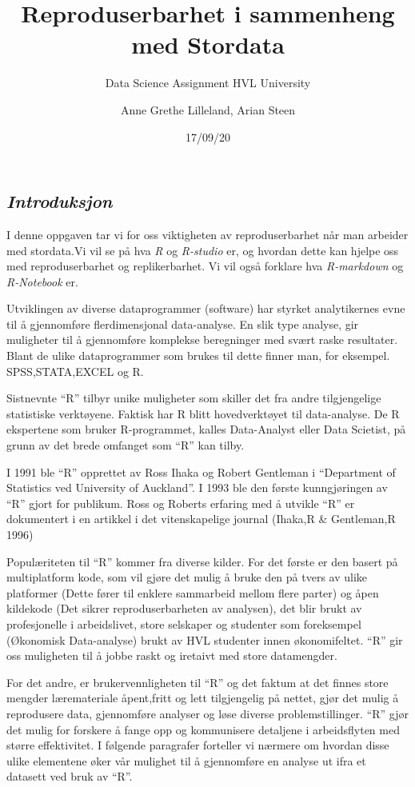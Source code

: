 \documentclass[
  norsk,
]{article}
\title{Reproduserbarhet i sammenheng med Stordata}
\subtitle{Data Science Assignment HVL University}
\author{Anne Grethe Lilleland, Arian Steen}
\date{17/09/20}
\begin{document}
\maketitle

\hypertarget{introduksjon}{%
\subsection{\texorpdfstring{
\emph{Introduksjon}}{ Introduksjon}}\label{introduksjon}}

I denne oppgaven tar vi for oss viktigheten av reproduserbarhet når man
arbeider med stordata.Vi vil se på hva \emph{R} og \emph{R-studio} er,
og hvordan dette kan hjelpe oss med reproduserbarhet og replikerbarhet.
Vi vil også forklare hva \emph{R-markdown} og \emph{R-Notebook} er.

Utviklingen av diverse dataprogrammer (software) har styrket
analytikernes evne til å gjennomføre flerdimensjonal data-analyse. En
slik type analyse, gir muligheter til å gjennomføre komplekse
beregninger med svært raske resultater. Blant de ulike dataprogrammer
som brukes til dette finner man, for eksempel. SPSS,STATA,EXCEL og R.

Sistnevnte ``R'' tilbyr unike muligheter som skiller det fra andre
tilgjengelige statistiske verktøyene. Faktisk har R blitt hovedverktøyet
til data-analyse. De R ekspertene som bruker R-programmet, kalles
Data-Analyst eller Data Scietist, på grunn av det brede omfanget som
``R'' kan tilby.

I 1991 ble ``R'' opprettet av Ross Ihaka og Robert Gentleman i
``Department of Statistics ved University of Auckland''. I 1993 ble den
første kunngjøringen av ``R'' gjort for publikum. Ross og Roberts
erfaring med å utvikle ``R'' er dokumentert i en artikkel i det
vitenskapelige journal (Ihaka,R \& Gentleman,R 1996)

Populæriteten til ``R'' kommer fra diverse kilder. For det første er den
basert på multiplatform kode, som vil gjøre det mulig å bruke den på
tvers av ulike platformer (Dette fører til enklere sammarbeid mellom
flere parter) og åpen kildekode (Det sikrer reproduserbarheten av
analysen), det blir brukt av profesjonelle i arbeidslivet, store
selskaper og studenter som foreksempel (Økonomisk Data-analyse) brukt av
HVL studenter innen økonomifeltet. ``R'' gir oss muligheten til å jobbe
raskt og iretaivt med store datamengder.

For det andre, er brukervennligheten til ``R'' og det faktum at det
finnes store mengder læremateriale åpent,fritt og lett tilgjengelig på
nettet, gjør det mulig å reprodusere data, gjennomføre analyser og løse
diverse problemstillinger. ``R'' gjør det mulig for forskere å fange opp
og kommunisere detaljene i arbeidsflyten med større effektivitet. I
følgende paragrafer forteller vi nærmere om hvordan disse ulike
elementene øker vår mulighet til å gjennomføre en analyse ut ifra et
datasett ved bruk av ``R''.
\end{document}

